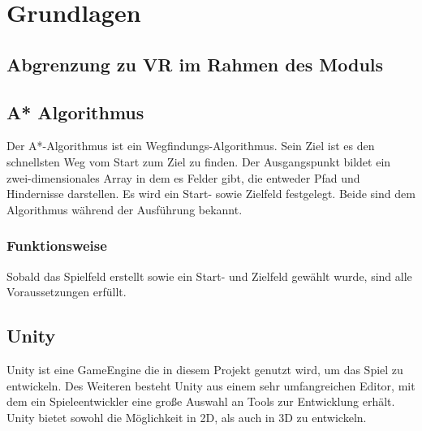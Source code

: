 \chapter{Grundlagen}
\section{Abgrenzung zu VR im Rahmen des Moduls}
\section{A* Algorithmus}
Der A*-Algorithmus ist ein Wegfindungs-Algorithmus. Sein Ziel ist es den schnellsten Weg vom Start zum Ziel zu finden. Der Ausgangspunkt bildet ein zwei-dimensionales Array in dem es Felder gibt, die entweder Pfad und Hindernisse darstellen. Es wird ein Start- sowie Zielfeld festgelegt. Beide sind dem Algorithmus während der Ausführung bekannt.
\subsection{Funktionsweise}
Sobald das Spielfeld erstellt sowie ein Start- und Zielfeld gewählt wurde, sind alle Voraussetzungen erfüllt.

\begin{center}
\end{center}

\label{sec:fundamentals}
\section{Unity}
Unity ist eine GameEngine die in diesem Projekt genutzt wird, um das Spiel zu entwickeln. Des Weiteren besteht Unity aus einem sehr umfangreichen Editor, mit dem ein Spieleentwickler eine große Auswahl an Tools zur Entwicklung erh\"alt. Unity bietet sowohl die M\"oglichkeit in 2D, als auch in 3D zu entwickeln.
